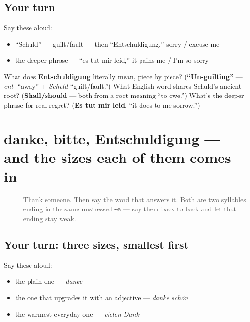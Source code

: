 \subsection*{Your turn}
Say these aloud:

\begin{itemize}
\raggedright
  \item \textquotedblleft{}Schuld\textquotedblright{} — guilt/fault — then \textquotedblleft{}Entschuldigung,\textquotedblright{} sorry / excuse me
  \item the deeper phrase — \textquotedblleft{}es tut mir leid,\textquotedblright{} it pains me / I'm so sorry
\end{itemize}

\begin{tcolorbox}[breakable,colback=teal!4,colframe=teal!35!black,title={Before you move on}]
What does \textbf{Entschuldigung} literally mean, piece by piece? (\textbf{\textquotedblleft{}Un-guilting\textquotedblright{}} — \emph{ent-} \textquotedblleft{}away\textquotedblright{} + \emph{Schuld} \textquotedblleft{}guilt/fault.\textquotedblright{}) What English word shares Schuld's ancient root? (\textbf{Shall/should} — both from a root meaning \textquotedblleft{}to owe.\textquotedblright{}) What's the deeper phrase for real regret? (\textbf{Es tut mir leid}, \textquotedblleft{}it does to me sorrow.\textquotedblright{})
\end{tcolorbox}
\section[Practice]{danke, bitte, Entschuldigung — and the sizes each of them comes in}

\label{lesson:GE-R20-danke-bitte-entschuldigung}



\begin{quote}
Thank someone. Then say the word that answers it. Both are two syllables ending in the same unstressed \textbf{-e} — say them back to back and let that ending stay weak.
\end{quote}

\subsection*{Your turn: three sizes, smallest first}
Say these aloud:

\begin{itemize}
\raggedright
  \item the plain one — \emph{danke}
  \item the one that upgrades it with an adjective — \emph{danke schön}
  \item the warmest everyday one — \emph{vielen Dank}
\end{itemize}

